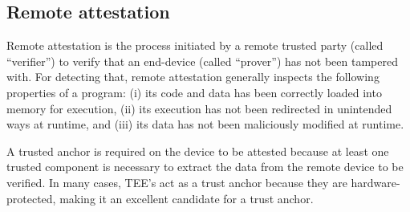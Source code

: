 \subsection{Remote attestation}

Remote attestation is the process initiated by a remote trusted party (called ``verifier'') to verify that an end-device (called ``prover'') has not been tampered with. For detecting that, remote attestation generally inspects the following properties of a program: (i) its code and data has been correctly loaded into memory for execution, (ii) its execution has not been redirected in unintended ways at runtime, and (iii) its data has not been maliciously modified at runtime.

A trusted anchor is required on the device to be attested because at least one trusted component is necessary to extract the data from the remote device to be verified. In many cases, TEE's act as a trust anchor because they are hardware-protected, making it an excellent candidate for a trust anchor.

